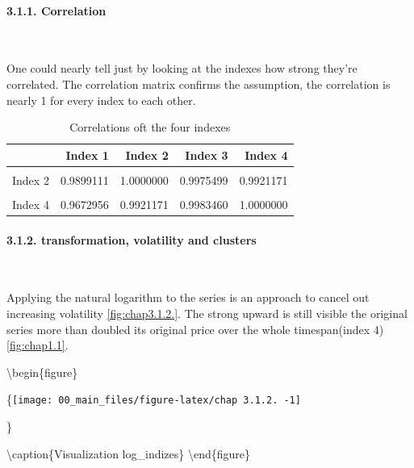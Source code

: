 \documentclass[
]{article}
\begin{document}
\hypertarget{correlation}{%
\paragraph{3.1.1. Correlation}\label{correlation}}

~

One could nearly tell just by looking at the indexes how strong they're
correlated. The correlation matrix confirms the assumption, the
correlation is nearly 1 for every index to each other.

\begin{table}[!h]

\caption{\label{tab:chap3.1.1.}Correlations oft the four indexes}
\centering
\begin{tabular}[t]{lrrrr}
\toprule
  & Index 1 & Index 2 & Index 3 & Index 4\\
\midrule
\cellcolor{gray!6}{Index 1} & \cellcolor{gray!6}{1.0000000} & \cellcolor{gray!6}{0.9899111} & \cellcolor{gray!6}{0.9788826} & \cellcolor{gray!6}{0.9672956}\\
Index 2 & 0.9899111 & 1.0000000 & 0.9975499 & 0.9921171\\
\cellcolor{gray!6}{Index 3} & \cellcolor{gray!6}{0.9788826} & \cellcolor{gray!6}{0.9975499} & \cellcolor{gray!6}{1.0000000} & \cellcolor{gray!6}{0.9983460}\\
Index 4 & 0.9672956 & 0.9921171 & 0.9983460 & 1.0000000\\
\bottomrule
\end{tabular}
\end{table}

\hypertarget{transformation-volatility-and-clusters}{%
\paragraph{3.1.2. transformation, volatility and
clusters}\label{transformation-volatility-and-clusters}}

~

Applying the natural logarithm to the series is an approach to cancel
out increasing volatility \ref{fig:chap3.1.2.}. The strong upward is
still visible the original series more than doubled its original price
over the whole timespan(index 4)\ref{fig:chap1.1}.

\textbackslash begin\{figure\}

\{\centering \texttt{[image: 00\_main\_files/figure-latex/chap 3.1.2. -1]}

\}

\textbackslash caption\{Visualization
log\_indizes\}\label{fig:chap 3.1.2. } \textbackslash end\{figure\}
\end{document}
